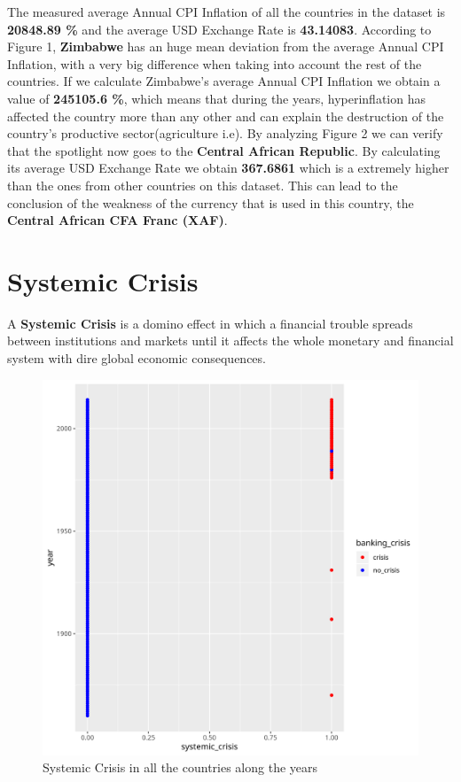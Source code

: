 \documentclass{article}
\begin{document}
    
    The measured average Annual CPI Inflation of all the countries in the dataset is 
    \textbf{20848.89 \%}  and the average USD Exchange Rate is \textbf{43.14083}.
    According to Figure 1, \textbf{Zimbabwe} has an huge mean deviation from the 
    average Annual CPI Inflation, with a very big difference when taking into account 
    the rest of the countries. 
    If we calculate Zimbabwe's average Annual CPI Inflation we obtain a value of \textbf{245105.6 \%}, 
    which means that during the years, hyperinflation has affected the country more than any other 
    and can explain the destruction of the country's productive sector(agriculture i.e).
    By analyzing Figure 2 we can verify that the spotlight now goes to the 
    \textbf{Central African Republic}.
    By calculating its average USD Exchange Rate we obtain \textbf{367.6861} 
    which is a extremely higher than the ones from other countries on this dataset. 
    This can lead to the conclusion of the weakness of the currency that is used in this country, 
    the \textbf{Central African CFA Franc (XAF)}.

    \newpage
    \section{Systemic Crisis}
    A \textbf{Systemic Crisis} is a domino effect in which a financial trouble spreads
    between institutions and markets until it affects the whole monetary
    and financial system with dire global economic consequences.
    \begin{figure}[h!]
        \caption{ Systemic Crisis in all the countries along the years }
        \includegraphics[scale=0.7]{plot1.png}
    \end{figure} 
\end{document}
